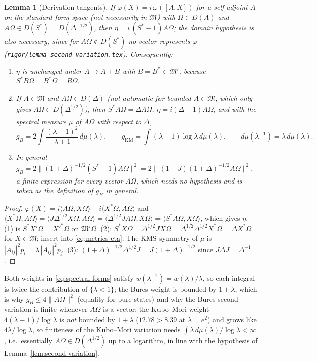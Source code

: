 \documentclass[11pt]{article}
\theoremstyle{accent}
\newtheorem{lemma}[theorem]{Lemma}
\theoremstyle{definition}
\newcommand{\cM}{\mathfrak{M}}
\begin{document}
\begin{lemma}[Derivation tangents]\label{lem:eta}
If \(\varphi(X)=i\,\omega([A,X])\) for a self-adjoint \(A\) on the standard-form space (not necessarily in \(\cM\)) with \(\Omega\in D(A)\) and \(A\Omega\in D(S^*)=D(\Delta^{-1/2})\), then \(\eta=i\,(S^*-1)A\Omega\); the domain hypothesis is also necessary, since for \(A\Omega\notin D(S^*)\) no vector represents \(\varphi\) (\texttt{rigor/lemma\_second\_variation.tex}).  Consequently:
\begin{enumerate}
\item \(\eta\) is unchanged under \(A\mapsto A+B\) with \(B=B^*\in\cM'\), because \(S^*B\Omega=B^*\Omega=B\Omega\).
\item If \(A\in\cM\) and \(A\Omega\in D(\Delta)\) (not automatic for bounded \(A\in\cM\), which only gives \(A\Omega\in D(\Delta^{1/2})\)), then \(S^*A\Omega=\Delta A\Omega\), \(\eta=i(\Delta-1)A\Omega\), and with the spectral measure \(\mu\) of \(A\Omega\) with respect to \(\Delta\),
\begin{equation}\label{eq:spectral-forms}
 g_B=2\int\frac{(\lambda-1)^2}{\lambda+1}\,d\mu(\lambda),\qquad g_{\mathrm{KM}}=\int(\lambda-1)\log\lambda\,d\mu(\lambda),\qquad d\mu(\lambda^{-1})=\lambda\,d\mu(\lambda).
\end{equation}
\item In general \(g_B=2\bigl\|(1+\Delta)^{-1/2}(S^*-1)A\Omega\bigr\|^2=2\bigl\|(1-J)(1+\Delta)^{-1/2}A\Omega\bigr\|^2\), a finite expression for every vector \(A\Omega\), which needs no hypothesis and is taken as the definition of \(g_B\) in general.
\end{enumerate}
\end{lemma}

\begin{proof}
\(\varphi(X)=i\langle A\Omega,X\Omega\rangle-i\langle X^*\Omega,A\Omega\rangle\) and \(\langle X^*\Omega,A\Omega\rangle=\langle J\Delta^{1/2}X\Omega,A\Omega\rangle=\langle\Delta^{1/2}JA\Omega,X\Omega\rangle=\langle S^*A\Omega,X\Omega\rangle\), which gives \(\eta\).  (1) is \(S^*X'\Omega=X'^*\Omega\) on \(\cM'\Omega\).  (2): \(S^*X\Omega=\Delta^{1/2}JX\Omega=\Delta^{1/2}\Delta^{1/2}X^*\Omega=\Delta X^*\Omega\) for \(X\in\cM\); insert into \eqref{eq:metrics-eta}.  The KMS symmetry of \(\mu\) is \(|A_{ij}|^2p_i=\lambda\,|A_{ij}|^2p_j\).  (3): \((1+\Delta)^{-1/2}\Delta^{1/2}J=J(1+\Delta)^{-1/2}\) since \(J\Delta J=\Delta^{-1}\).
\end{proof}

Both weights in \eqref{eq:spectral-forms} satisfy \(w(\lambda^{-1})=w(\lambda)/\lambda\), so each integral is twice the contribution of \(\{\lambda<1\}\); the Bures weight is bounded by \(1+\lambda\), which is why \(g_B\le4\|A\Omega\|^2\) (equality for pure states) and why the Bures second variation is finite whenever \(A\Omega\) is a vector; the Kubo--Mori weight \(4(\lambda-1)/\log\lambda\) is \emph{not} bounded by \(1+\lambda\) (\(12.78>8.39\) at \(\lambda=e^2\)) and grows like \(4\lambda/\log\lambda\), so finiteness of the Kubo--Mori variation needs \(\int\lambda\,d\mu(\lambda)/\log\lambda<\infty\), i.e.\ essentially \(A\Omega\in D(\Delta^{1/2})\) up to a logarithm, in line with the hypothesis of Lemma~\ref{lem:second-variation}.
\end{document}
